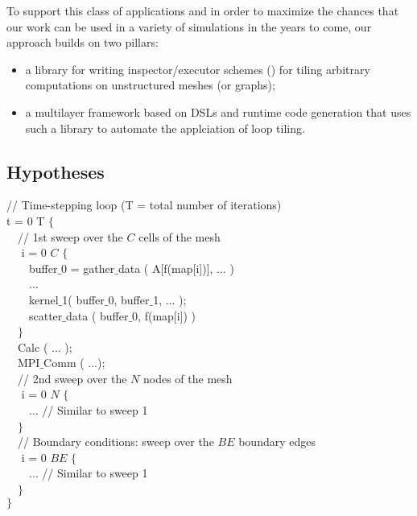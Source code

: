 To support this class of applications and in order to maximize the chances that our work can be used in a variety of simulations in the years to come, our approach builds on two pillars:
\begin{itemize}
\item a library for writing inspector/executor schemes (\cite{IEscheme}) for tiling arbitrary computations on unstructured meshes (or graphs);
\item a multilayer framework based on DSLs and runtime code generation that uses such a library to automate the applciation of loop tiling.
\end{itemize}

\subsection{Hypotheses}
\label{sec:tiling:struct}

\begin{algorithm}
\scriptsize\ttfamily
{}

// Time-stepping loop (T = total number of iterations)\\
 t = 0  T $\lbrace$\\
~~// 1st sweep over the $C$ cells of the mesh\\
~~ i = 0  $C$ $\lbrace$\\
~~~~buffer$\_$0 = gather$\_$data ( A[f(map[i])], ... )\\
~~~~...\\
~~~~kernel$\_$1( buffer$\_$0, buffer$\_$1, ... );\\
~~~~scatter$\_$data ( buffer$\_$0, f(map[i]) )\\
~~$\rbrace$\\
~~Calc ( ... );\\
~~MPI$\_$Comm ( ...); \\
~~// 2nd sweep over the $N$ nodes of the mesh\\
~~ i = 0  $N$ $\lbrace$\\
~~~~... // Similar to sweep 1 \\
~~$\rbrace$\\
~~// Boundary conditions: sweep over the $BE$ boundary edges\\
~~ i = 0  $BE$ $\lbrace$\\
~~~~... // Similar to sweep 1 \\
~~$\rbrace$\\
$\rbrace$
\caption{....}
\label{code:tiling-struct}
\end{algorithm}

